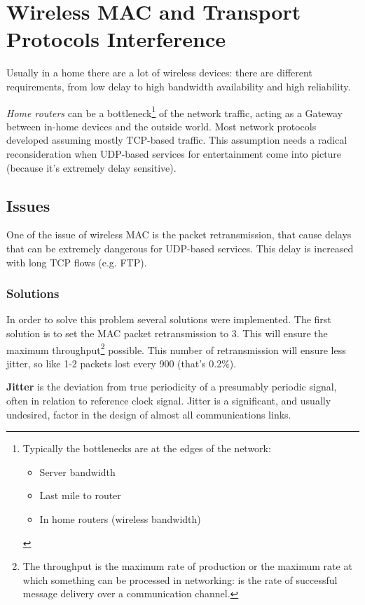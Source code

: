 \chapter{Wireless MAC and Transport Protocols Interference}


Usually in a home there are a lot of wireless devices: there are different
requirements, from low delay to high bandwidth availability and high
reliability.

\textit{Home routers} can be a bottleneck\footnote{
  Typically the bottlenecks are at the edges of the network:
  \begin{itemize}
  \item Server bandwidth
  \item Last mile to router
  \item In home routers (wireless bandwidth)
  \end{itemize}
}
of the network traffic, acting as a Gateway between in-home devices and the
outside world.
Most network protocols developed assuming mostly TCP-based traffic. This
assumption needs a radical reconsideration when UDP-based services for
entertainment come into picture (because it's extremely delay sensitive).

\section{Issues}

One of the issue of wireless MAC is the packet retransmission, that cause delays
that can be extremely dangerous for UDP-based services. This delay is increased
with long TCP flows (e.g. FTP).

\subsection{Solutions}

In order to solve this problem several solutions were implemented. The first
solution is to set the MAC packet retransmission to 3. This will ensure the
maximum throughput\footnote{
  The throughput is the maximum rate of production or the maximum rate at which
  something can be processed in networking: is the rate of successful message
  delivery over a communication channel.
}
possible. This number of retransmission will ensure less jitter, so like 1-2
packets lost every 900 (that's 0.2\%).

\textbf{Jitter} is the deviation from true periodicity of a presumably
periodic signal, often in relation to reference clock signal. Jitter is a
significant, and usually undesired, factor in the design of almost all
communications links.

